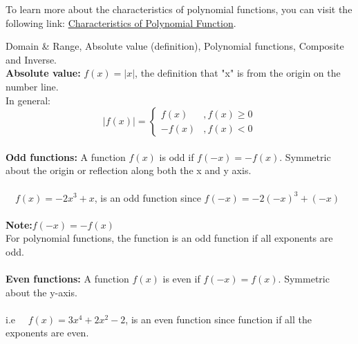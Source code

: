 \documentclass{article}
\begin{document}
To learn more about the characteristics of polynomial functions, you can visit the following link: \href{https://mathematicalmysteries.org/characteristics-of-polynomials/}{Characteristics of Polynomial Function}.






















\newpage
Domain \& Range, Absolute value (definition), Polynomial functions, Composite and Inverse. \\ 

\textbf{Absolute value:} $f(x)= |x|$, the definition that "x" is from the origin on the number line. \\ 
In general:\\
$$
|f(x)|=
\begin{cases}
f(x) &, f(x) \ge 0\\
-f(x) &, f(x) < 0
\end{cases}
$$
\\
\textbf{Odd functions:} A function $f(x)$ is odd if $f(-x)= -f(x)$. Symmetric about the origin or reflection along both the x and y axis. \\ \\

$\quad f(x)=-2x^3+x$, is an odd function since $f(-x)=-2(-x)^3+(-x)$ \\ \\ 

\textbf{Note:}$f(-x)=-f(x)$ \\ 
For polynomial functions, the function is an odd function if all exponents are odd. \\ \\ 


\textbf{Even functions:} A function $f(x)$ is even if $f(-x)=f(x)$. Symmetric about the y-axis. \\ \\ 

i.e $\quad f(x)=3x^4+2x^2-2$, is an even function since function if all the exponents are even. \\ \\ 
\end{document}
